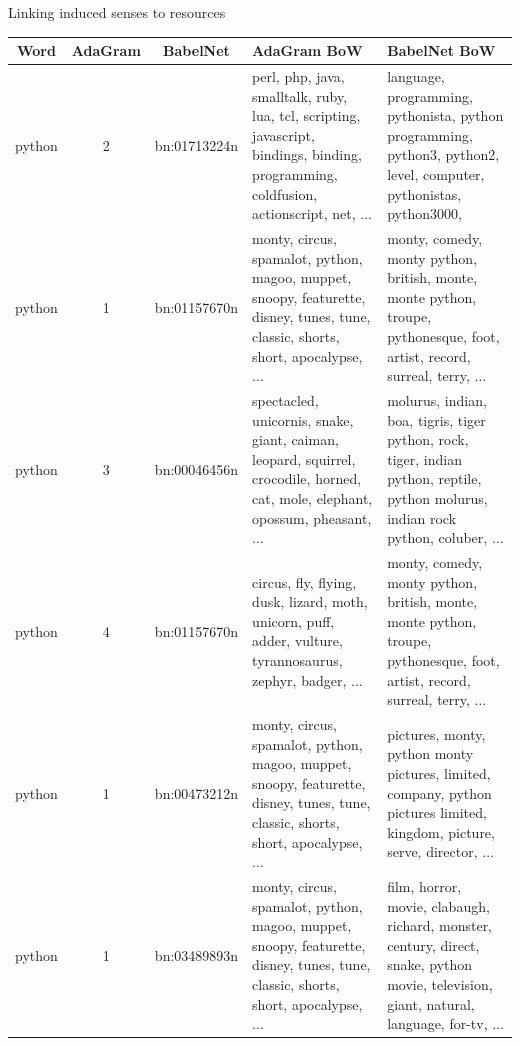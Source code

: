 \begin{frame}{ Linking induced senses to resources }
\vspace{-1em}
\begin{table}

\tiny  
\begin{center}
\begin{tabular}{ccc p{3cm} p{3cm}}

\bf Word & \bf AdaGram & \bf BabelNet & \bf AdaGram BoW & \bf BabelNet BoW  \\
\hline

python & 2 & bn:01713224n   & perl, php, java, smalltalk, ruby, lua, tcl, scripting, javascript, bindings, binding, programming, coldfusion, actionscript, net, $\ldots$ &  language, programming, pythonista,  python programming, python3, python2, level, computer, pythonistas, python3000, \\ \hline

python & 1 & bn:01157670n & monty, circus, spamalot, python, magoo, muppet, snoopy, featurette, disney, tunes, tune, classic, shorts, short, apocalypse, $\ldots$ &  monty, comedy, monty python, british, monte, monte python, troupe, pythonesque, foot, artist, record, surreal, terry, $\ldots$ \\ \hline

python & 3 & bn:00046456n  & spectacled, unicornis, snake, giant, caiman, leopard, squirrel, crocodile, horned, cat, mole, elephant, opossum, pheasant, $\ldots$ &  molurus, indian, boa, tigris, tiger python, rock, tiger, indian python, reptile, python molurus, indian rock python, coluber, $\ldots$ \\ \hline

python & 4 & bn:01157670n & circus, fly, flying, dusk, lizard, moth, unicorn, puff, adder, vulture, tyrannosaurus, zephyr, badger, $\ldots$ & monty, comedy, monty python, british, monte, monte python, troupe, pythonesque, foot, artist, record, surreal, terry, $\ldots$ \\ \hline

python & 1 & bn:00473212n  & monty, circus, spamalot, python, magoo, muppet, snoopy, featurette, disney, tunes, tune, classic, shorts, short, apocalypse, $\ldots$ &  pictures, monty, python monty pictures, limited, company, python pictures limited, kingdom, picture, serve, director, $\ldots$ \\ \hline

python & 1 & bn:03489893n  & monty, circus, spamalot, python, magoo, muppet, snoopy, featurette, disney, tunes, tune, classic, shorts, short, apocalypse, $\ldots$ &  film, horror, movie, clabaugh, richard, monster, century, direct, snake, python movie, television, giant, natural, language, for-tv, $\ldots$ 
\end{tabular}
\end{center}
\end{table}
	
	
\end{frame}


